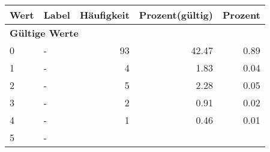      \begin{longtable}{lXrrr}
     \toprule
     \textbf{Wert} & \textbf{Label} & \textbf{Häufigkeit} & \textbf{Prozent(gültig)} & \textbf{Prozent} \\
     \endhead
     \midrule
     \multicolumn{5}{l}{\textbf{Gültige Werte}}\\

     0 &
     \multicolumn{1}{X}{ -  } &


       \num{93} &
       \num[round-mode=places,round-precision=2]{42.47} &
         \num[round-mode=places,round-precision=2]{0.89} \\

     1 &
     \multicolumn{1}{X}{ -  } &


       \num{4} &
       \num[round-mode=places,round-precision=2]{1.83} &
         \num[round-mode=places,round-precision=2]{0.04} \\

     2 &
     \multicolumn{1}{X}{ -  } &


       \num{5} &
       \num[round-mode=places,round-precision=2]{2.28} &
         \num[round-mode=places,round-precision=2]{0.05} \\

     3 &
     \multicolumn{1}{X}{ -  } &


       \num{2} &
       \num[round-mode=places,round-precision=2]{0.91} &
         \num[round-mode=places,round-precision=2]{0.02} \\

     4 &
     \multicolumn{1}{X}{ -  } &


       \num{1} &
       \num[round-mode=places,round-precision=2]{0.46} &
         \num[round-mode=places,round-precision=2]{0.01} \\

     5 &
     \multicolumn{1}{X}{ -  } &



\end{longtable}
